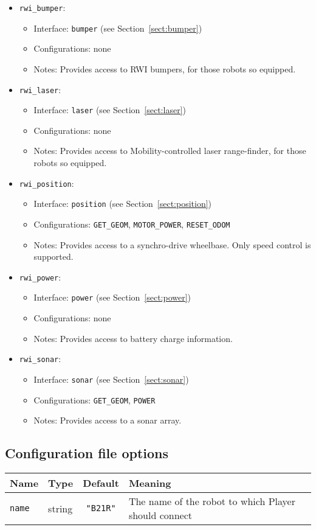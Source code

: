 \begin{itemize}
\item {\tt rwi\_bumper}:
  \begin{itemize}
  \item Interface: {\tt bumper} (see Section~\ref{sect:bumper})
  \item Configurations: none
  \item Notes: Provides access to RWI bumpers, for those robots so equipped.
  \end{itemize}
\item {\tt rwi\_laser}:
  \begin{itemize}
  \item Interface: {\tt laser} (see Section~\ref{sect:laser})
  \item Configurations: none
  \item Notes: Provides access to Mobility-controlled laser range-finder, for 
        those robots so equipped.
  \end{itemize}
\item {\tt rwi\_position}:
  \begin{itemize}
  \item Interface: {\tt position} (see Section~\ref{sect:position})
  \item Configurations: {\tt GET\_GEOM}, {\tt MOTOR\_POWER}, {\tt RESET\_ODOM}
  \item Notes: Provides access to a synchro-drive wheelbase.  
               Only speed control is supported.
  \end{itemize}
\item {\tt rwi\_power}:
  \begin{itemize}
  \item Interface: {\tt power} (see Section~\ref{sect:power})
  \item Configurations: none
  \item Notes: Provides access to battery charge information.
  \end{itemize}
\item {\tt rwi\_sonar}:
  \begin{itemize}
  \item Interface: {\tt sonar} (see Section~\ref{sect:sonar})
  \item Configurations: {\tt GET\_GEOM}, {\tt POWER}
  \item Notes: Provides access to a sonar array.
  \end{itemize}
\end{itemize}

\subsection*{Configuration file options}
\begin{center}
{\small \begin{tabular}{|l|l|c|l|}
\hline
Name & Type & Default & Meaning\\
\hline
{\tt name} & string & {\tt "B21R"} & The name of the robot to which Player
should connect\\
\hline
\end{tabular}}
\end{center}

